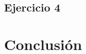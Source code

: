 \documentclass{article}
\theoremstyle{theorem-style}  %
\theoremstyle{definition-style}
\theoremstyle{example-style}
\begin{document}
\subsection{Ejercicio 4}


\section{Conclusión} \label{sec:conclusion}



\printbibliography
\end{document}

